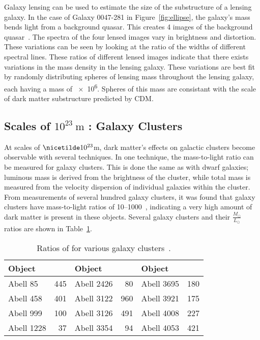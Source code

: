 Galaxy lensing can be used to estimate the size of the substructure of a lensing galaxy.
In the case of Galaxy 0047-281 in Figure~\ref{fig:ellipse}, the galaxy's mass bends light from a background quasar.
This creates 4 images of the background quasar~\cite{weak_lensing_quasar}.
The spectra of the four lensed images vary in brightness and distortion.
These variations can be seen by looking at the ratio of the widths of different spectral lines.
These ratios of different lensed images indicate that there exists variations in the mass density in the lensing galaxy.
These variations are best fit by randomly distributing spheres of lensing mass throughout the lensing galaxy, each having a mass of \SI{e6}{\Msol}.
Spheres of this mass are consistant with the scale of dark matter substructure predicted by CDM.

\subsection{Scales of $10^{23}\:\text{m}$ : Galaxy Clusters}\label{dm_galclusters}
%
At scales of $\nicetilde 10^{23}$m, dark matter's effects on galactic clusters become observable with several techniques.
In one technique, the mass-to-light ratio can be measured for galaxy clusters.
This is done the same as with dwarf galaxies; luminous mass is derived from the brightness of the cluster, while total mass is measured from the velocity dispersion of individual galaxies within the cluster.
From measurements of several hundred galaxy clusters, it was found that galaxy clusters have mass-to-light ratios of \SIrange{10}{1000}{}~\cite{cluster_ml_ratios}, indicating a very high amount of dark matter is present in these objects.
Several galaxy clusters and their $\frac{M_\odot}{L_\odot}$ ratios are shown in Table~\ref{tab:cluster_ml_ratios}.

\begin{table}
  \centering
  \caption[Ratios of \MLsol for Various Galaxy Clusters]{
    Ratios of \MLsol for various galaxy clusters~\cite{cluster_ml_ratios}.
    }
  \label{tab:cluster_ml_ratios}
  \begin{tabular}{l r | l r | l r}
    Object & \mlratio{} & Object & \mlratio{} & Object & \mlratio{} \\
    \hline
    Abell   85 & 445 & Abell 2426 &  80 & Abell 3695 & 180 \\
    Abell  458 & 401 & Abell 3122 & 960 & Abell 3921 & 175 \\
    Abell  999 & 100 & Abell 3126 & 491 & Abell 4008 & 227 \\
    Abell 1228 &  37 & Abell 3354 &  94 & Abell 4053 & 421 \\
  \end{tabular}
\end{table}
    
